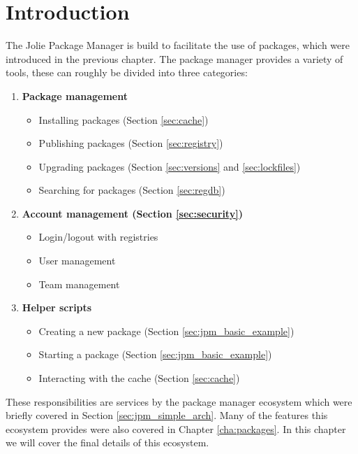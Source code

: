 \section{Introduction}

The Jolie Package Manager is build to facilitate the use of packages, which
were introduced in the previous chapter. The package manager provides a variety
of tools, these can roughly be divided into three categories:

\begin{enumerate}
\item \textbf{Package management}
    \begin{itemize}
        \item Installing packages (Section \ref{sec:cache})
        \item Publishing packages (Section \ref{sec:registry})
        \item Upgrading packages (Section \ref{sec:versions} and
                \ref{sec:lockfiles})
        \item Searching for packages (Section \ref{sec:regdb})
    \end{itemize}
\item \textbf{Account management (Section \ref{sec:security})}
    \begin{itemize}
        \item Login/logout with registries
        \item User management
        \item Team management
    \end{itemize}
\item \textbf{Helper scripts}
    \begin{itemize}
        \item Creating a new package (Section \ref{sec:jpm_basic_example})
        \item Starting a package (Section \ref{sec:jpm_basic_example})
        \item Interacting with the cache (Section \ref{sec:cache})
    \end{itemize}
\end{enumerate}

These responsibilities are services by the package manager ecosystem which were
briefly covered in Section \ref{sec:jpm_simple_arch}. Many of the features this
ecosystem provides were also covered in Chapter \ref{cha:packages}. In this
chapter we will cover the final details of this ecosystem.

